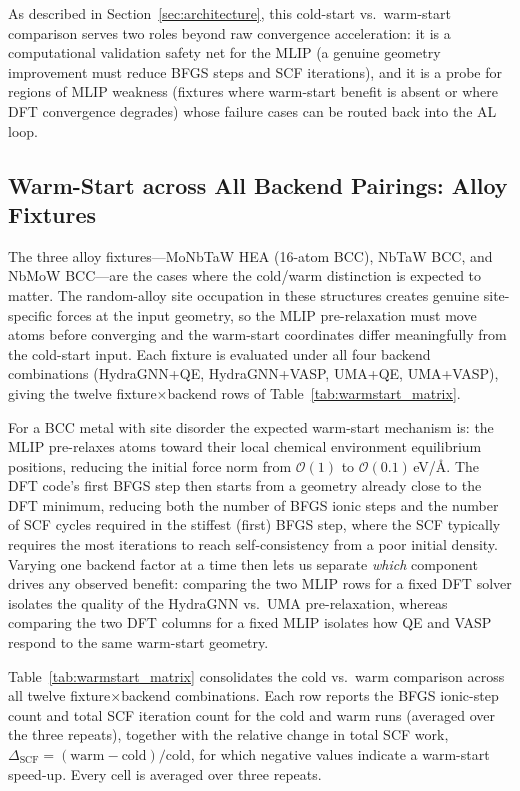\documentclass[conference]{IEEEtran}
\def\acs#1{#1}%
\begin{document}
As described in Section~\ref{sec:architecture}, this cold-start vs.\ warm-start
comparison serves two roles beyond raw convergence acceleration: it is a
computational validation safety net for the \acs{MLIP} (a genuine geometry
improvement must reduce \acs{BFGS} steps and \acs{SCF} iterations), and it is a
probe for regions of \acs{MLIP} weakness (fixtures where warm-start benefit is
absent or where \acs{DFT} convergence degrades) whose failure cases can be routed
back into the \acs{AL} loop.

\subsection{Warm-Start across All Backend Pairings: Alloy Fixtures}
\label{sec:results:warmstart_hea}
The three alloy fixtures---MoNbTaW \acs{HEA} (16-atom BCC), NbTaW BCC, and
NbMoW BCC---are the cases where the cold/warm distinction is expected to matter.
The random-alloy site occupation in these structures creates genuine
site-specific forces at the input geometry, so the \acs{MLIP} pre-relaxation must
move atoms before converging and the warm-start coordinates differ meaningfully
from the cold-start input. Each fixture is evaluated under all four backend
combinations (HydraGNN+\acs{QE}, HydraGNN+\acs{VASP}, UMA+\acs{QE}, UMA+\acs{VASP}),
giving the twelve fixture$\times$backend rows of Table~\ref{tab:warmstart_matrix}.

For a BCC metal with site disorder the expected warm-start mechanism is:
the \acs{MLIP} pre-relaxes atoms toward their local chemical environment
equilibrium positions, reducing the initial force norm from $\mathcal{O}(1)$
to $\mathcal{O}(0.1)$\,eV/\AA. The \acs{DFT} code's first \acs{BFGS} step then starts
from a geometry already close to the \acs{DFT} minimum, reducing both the number
of \acs{BFGS} ionic steps and the number of \acs{SCF} cycles required in the stiffest
(first) \acs{BFGS} step, where the \acs{SCF} typically requires the most iterations to
reach self-consistency from a poor initial density. Varying one backend factor
at a time then lets us separate \emph{which} component drives any observed
benefit: comparing the two \acs{MLIP} rows for a fixed \acs{DFT} solver isolates
the quality of the HydraGNN vs.\ UMA pre-relaxation, whereas comparing the two
\acs{DFT} columns for a fixed \acs{MLIP} isolates how \acs{QE} and \acs{VASP}
respond to the same warm-start geometry.

Table~\ref{tab:warmstart_matrix} consolidates the cold vs.\ warm comparison
across all twelve fixture$\times$backend combinations. Each row reports the
\acs{BFGS} ionic-step count and total \acs{SCF} iteration count for the cold and
warm runs (averaged over the three repeats), together with the relative change
in total \acs{SCF} work, $\Delta_\text{SCF} = (\text{warm}-\text{cold})/\text{cold}$,
for which negative values indicate a warm-start speed-up. Every cell is averaged
over three repeats.
\end{document}
